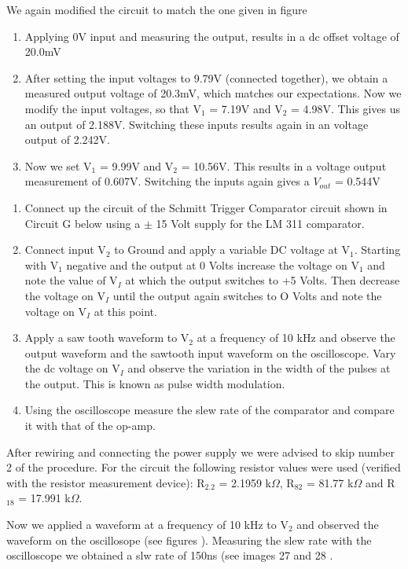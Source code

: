 We again modified the circuit to match the one given in figure 
\begin{enumerate}
	\item Applying 0V input and measuring the output, results in a dc offset voltage of 20.0mV
	\item After setting the input voltages to 9.79V (connected together), we obtain a measured output voltage of 20.3mV, which matches our expectations. 
		Now we modify the input voltages, so that V$_1$ = 7.19V and V$_2$ = 4.98V. This gives us an output of 2.188V. 
		Switching these inputs results again in an voltage output of 2.242V. 
	\item Now we set V$_1$ = 9.99V and V$_2$ = 10.56V. This results in a voltage output measurement of 0.607V. Switching the inputs again gives a $V_{out}$ = 0.544V
\end{enumerate}




\begin{enumerate}
	\item Connect up the circuit of the Schmitt Trigger Comparator circuit shown in Circuit G below using a $\pm$ 15 Volt supply for the LM 311 comparator.
\item Connect input V$_2$ to Ground and apply a variable DC voltage at V$_1$. Starting with V$_1$ negative and the output at 0 Volts increase the voltage on V$_1$ and note the value of V$_I$ at which the
output switches to +5 Volts. Then decrease the voltage on V$_I$ until the output again switches
to O Volts and note the voltage on V$_I$ at this point.

\item Apply a saw tooth waveform to V$_2$ at a frequency of 10 kHz and observe the output
waveform and the sawtooth input waveform on the oscilloscope. Vary the dc voltage on V$_I$
and observe the variation in the width of the pulses at the output. This is known as pulse
width modulation.

\item Using the oscilloscope measure the slew rate of the comparator and compare it with that of
the op-amp.
\end{enumerate}


After rewiring and connecting the power supply we were advised to skip number 2 of the procedure.
For the circuit the following resistor values were used (verified with the resistor measurement device): R$_{2.2}$ = 2.1959 k$\Omega$, R$_{82}$ = 81.77 k$\Omega$ and R$_{18}$ = 17.991 k$\Omega$.


Now we applied a waveform at a frequency of 10 kHz to V$_2$ and observed the waveform on the oscillosope (see figures ).
Measuring the slew rate with the oscilloscope we obtained a slw rate of 150ns (see images 27 and 28 .
%
%
%
%
%

